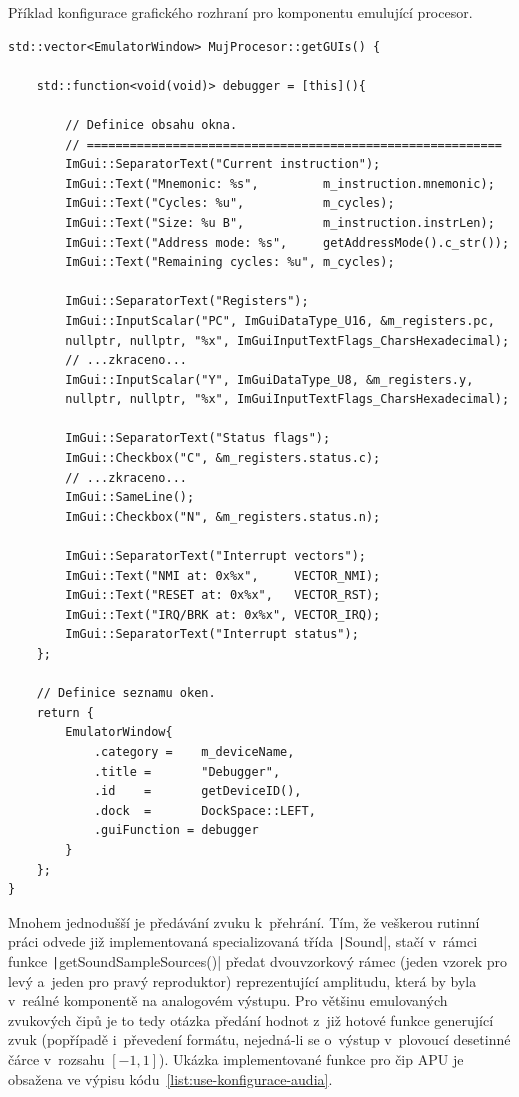 \begin{listing}
	\caption{Příklad konfigurace grafického rozhraní pro komponentu emulující procesor.}
	\label{list:use-konfigurace-gui}
	\begin{verbatim}
std::vector<EmulatorWindow> MujProcesor::getGUIs() {
	
	std::function<void(void)> debugger = [this](){
		
		// Definice obsahu okna.
		// ==========================================================
		ImGui::SeparatorText("Current instruction");
		ImGui::Text("Mnemonic: %s",         m_instruction.mnemonic);
		ImGui::Text("Cycles: %u",           m_cycles);
		ImGui::Text("Size: %u B",           m_instruction.instrLen);
		ImGui::Text("Address mode: %s",     getAddressMode().c_str());
		ImGui::Text("Remaining cycles: %u", m_cycles);
		
		ImGui::SeparatorText("Registers");
		ImGui::InputScalar("PC", ImGuiDataType_U16, &m_registers.pc,
		nullptr, nullptr, "%x", ImGuiInputTextFlags_CharsHexadecimal);
		// ...zkraceno...
		ImGui::InputScalar("Y", ImGuiDataType_U8, &m_registers.y,
		nullptr, nullptr, "%x", ImGuiInputTextFlags_CharsHexadecimal);
		
		ImGui::SeparatorText("Status flags");
		ImGui::Checkbox("C", &m_registers.status.c);
		// ...zkraceno...
		ImGui::SameLine();
		ImGui::Checkbox("N", &m_registers.status.n);
		
		ImGui::SeparatorText("Interrupt vectors");
		ImGui::Text("NMI at: 0x%x",     VECTOR_NMI);
		ImGui::Text("RESET at: 0x%x",   VECTOR_RST);
		ImGui::Text("IRQ/BRK at: 0x%x", VECTOR_IRQ);
		ImGui::SeparatorText("Interrupt status");
	};
	
	// Definice seznamu oken.
	return {
		EmulatorWindow{
			.category =    m_deviceName,
			.title =       "Debugger",
			.id    =       getDeviceID(),
			.dock  =       DockSpace::LEFT,
			.guiFunction = debugger
		}
	};
}
	\end{verbatim}
\end{listing}

Mnohem jednodušší je předávání zvuku k~přehrání. Tím, že veškerou rutinní práci odvede již implementovaná specializovaná třída \texttt|Sound|, stačí v~rámci funkce \texttt|getSoundSampleSources()| předat dvouvzorkový rámec (jeden vzorek pro levý a~jeden pro pravý reproduktor) reprezentující amplitudu, která by byla v~reálné komponentě na analogovém výstupu. Pro většinu emulovaných zvukových čipů je to tedy otázka předání hodnot z~již hotové funkce generující zvuk (popřípadě i~převedení formátu, nejedná-li se o~výstup v~plovoucí desetinné čárce v~rozsahu $[-1, 1]$). Ukázka implementované funkce pro čip APU je obsažena ve výpisu kódu~\ref{list:use-konfigurace-audia}.


